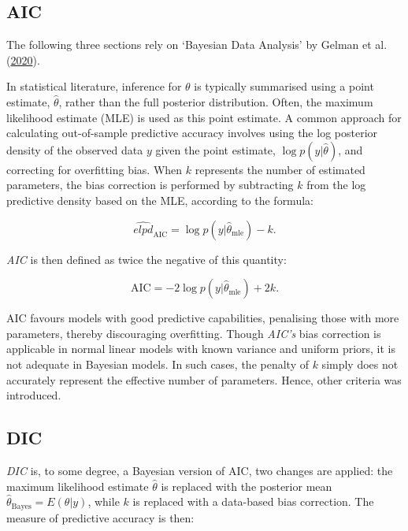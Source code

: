 \documentclass[
  11pt,
]{article}
\begin{document}
\subsection{AIC}

The following three sections rely on `Bayesian Data Analysis' by Gelman
et al. (\protect\hyperlink{ref-Gelman2020}{2020}).

In statistical literature, inference for \(\theta\) is typically
summarised using a point estimate, \(\hat{\theta}\), rather than the
full posterior distribution. Often, the maximum likelihood estimate
(MLE) is used as this point estimate. A common approach for calculating
out-of-sample predictive accuracy involves using the log posterior
density of the observed data \(y\) given the point estimate,
\(\log p(y|\hat{\theta})\), and correcting for overfitting bias. When
\(k\) represents the number of estimated parameters, the bias correction
is performed by subtracting \(k\) from the log predictive density based
on the MLE, according to the formula:

\begin{equation}
\widehat{elpd}_{\text{AIC}} = \log p(y|\hat{\theta}_{\text{mle}}) - k.
\end{equation}

\emph{AIC} is then defined as twice the negative of this quantity:

\begin{equation}
\text{AIC} = -2 \log p(y|\hat{\theta}_{\text{mle}}) + 2k.
\end{equation}

AIC favours models with good predictive capabilities, penalising those
with more parameters, thereby discouraging overfitting. Though
\emph{AIC's} bias correction is applicable in normal linear models with
known variance and uniform priors, it is not adequate in Bayesian
models. In such cases, the penalty of \(k\) simply does not accurately
represent the effective number of parameters. Hence, other criteria was
introduced.

\subsection{DIC}

\emph{DIC} is, to some degree, a Bayesian version of AIC, two changes
are applied: the maximum likelihood estimate \(\hat{\theta}\) is
replaced with the posterior mean
\(\hat{\theta}_{\text{Bayes}} = E(\theta | y)\), while \(k\) is replaced
with a data-based bias correction. The measure of predictive accuracy is
then:
\end{document}
